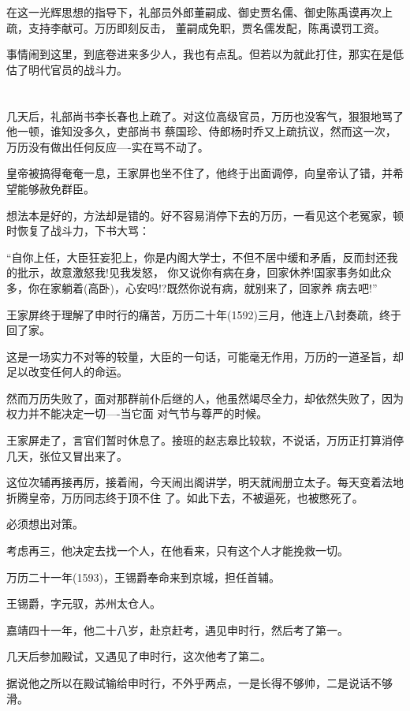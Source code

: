 \documentclass[11pt,a4paper,onecolumn]{article}
\begin{document}
在这一光辉思想的指导下，礼部员外郎董嗣成、御史贾名儒、御史陈禹谟再次上疏，支持李献可。万历即刻反击，
董嗣成免职，贾名儒发配，陈禹谟罚工资。

事情闹到这里，到底卷进来多少人，我也有点乱。但若以为就此打住，那实在是低估了明代官员的战斗力。

\section[\thesection]{}

几天后，礼部尚书李长春也上疏了。对这位高级官员，万历也没客气，狠狠地骂了他一顿，谁知没多久，吏部尚书
蔡国珍、侍郎杨时乔又上疏抗议，然而这一次，万历没有做出任何反应----实在骂不动了。

皇帝被搞得奄奄一息，王家屏也坐不住了，他终于出面调停，向皇帝认了错，并希望能够赦免群臣。

想法本是好的，方法却是错的。好不容易消停下去的万历，一看见这个老冤家，顿时恢复了战斗力，下书大骂：

``自你上任，大臣狂妄犯上，你是内阁大学士，不但不居中缓和矛盾，反而封还我的批示，故意激怒我!见我发怒，
你又说你有病在身，回家休养!国家事务如此众多，你在家躺着(高卧)，心安吗!?既然你说有病，就别来了，回家养
病去吧!''

王家屏终于理解了申时行的痛苦，万历二十年(1592)三月，他连上八封奏疏，终于回了家。

这是一场实力不对等的较量，大臣的一句话，可能毫无作用，万历的一道圣旨，却足以改变任何人的命运。

然而万历失败了，面对那群前仆后继的人，他虽然竭尽全力，却依然失败了，因为权力并不能决定一切----当它面
对气节与尊严的时候。

王家屏走了，言官们暂时休息了。接班的赵志皋比较软，不说话，万历正打算消停几天，张位又冒出来了。

这位次辅再接再厉，接着闹，今天闹出阁讲学，明天就闹册立太子。每天变着法地折腾皇帝，万历同志终于顶不住
了。如此下去，不被逼死，也被憋死了。

必须想出对策。

考虑再三，他决定去找一个人，在他看来，只有这个人才能挽救一切。

万历二十一年(1593)，王锡爵奉命来到京城，担任首辅。

王锡爵，字元驭，苏州太仓人。

嘉靖四十一年，他二十八岁，赴京赶考，遇见申时行，然后考了第一。

几天后参加殿试，又遇见了申时行，这次他考了第二。

据说他之所以在殿试输给申时行，不外乎两点，一是长得不够帅，二是说话不够滑。
\end{document}
